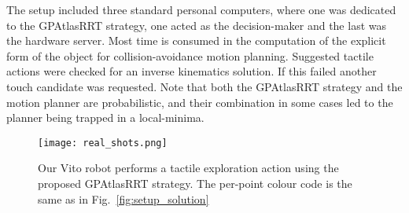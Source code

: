 The setup included three standard personal computers, where one was dedicated to the GPAtlasRRT strategy, one acted as the decision-maker and the last was the hardware server. Most time is consumed in the computation of the explicit form of the object for collision-avoidance motion planning. Suggested tactile actions were checked for an inverse kinematics solution. If this failed another touch candidate was requested. Note that both the GPAtlasRRT strategy and the motion planner are probabilistic, and their combination in some cases led to the planner being trapped in a local-minima.

\begin{figure}
\centering
  \texttt{[image: real\_shots.png]}
\caption{Our Vito robot performs a tactile exploration action using the proposed GPAtlasRRT strategy. The per-point colour code  is the same as in Fig.~\ref{fig:setup_solution}}
\label{fig:real}
\end{figure}